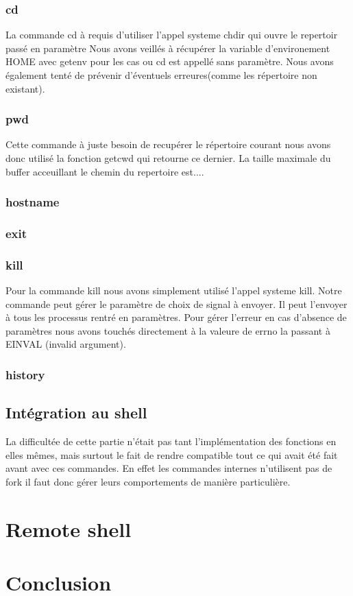 \documentclass[12pt]{article}
\begin{document}
 \subsubsection{cd}
 La commande cd à requis d'utiliser l'appel systeme chdir qui ouvre le repertoir passé en paramètre
 Nous avons veillés à récupérer la variable d'environement HOME avec getenv pour les cas ou cd est
 appellé sans paramètre. Nous avons également tenté de prévenir d'éventuels erreures(comme les
 répertoire non existant).
 
 \subsubsection{pwd}
 Cette commande à juste besoin de recupérer le répertoire courant nous avons donc utilisé
 la fonction getcwd qui retourne ce dernier. La taille maximale du buffer acceuillant le chemin
 du repertoire est....
 
 \subsubsection{hostname}
 
 \subsubsection{exit}
 
 \subsubsection{kill}
 Pour la commande kill nous avons simplement utilisé l'appel systeme kill. Notre commande
 peut gérer le paramètre de choix de signal à envoyer. Il peut l'envoyer à tous les processus
 rentré en paramètres.
 Pour gérer l'erreur en cas d'absence de paramètres nous avons touchés directement à la valeure
 de errno la passant à EINVAL (invalid argument).
 
 \subsubsection{history}
 
 \subsection{Intégration au shell}
 
 La difficultée de cette partie n'était pas tant l'implémentation des fonctions en elles mêmes,
 mais surtout le fait de rendre compatible tout ce qui avait été fait avant avec ces commandes.
 En effet les commandes internes n'utilisent pas de fork il faut donc gérer leurs comportements
 de manière particulière.

\newpage
\section{Remote shell}


\newpage
\section{Conclusion}
\end{document}
